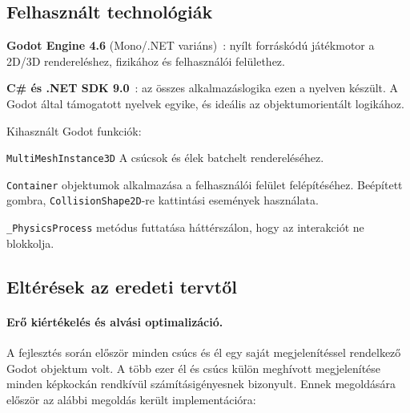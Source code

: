\subsection{Felhasznált technológiák}

\begin{compactitem}
\item \textbf{Godot Engine 4.6} (Mono/.NET variáns)~\cite{godot_engine}: nyílt forráskódú játékmotor a 2D/3D rendereléshez, fizikához és felhasználói felülethez.
\item \textbf{C\# és .NET SDK 9.0}~\cite{dotnet9}: az összes alkalmazáslogika ezen a nyelven készült. A Godot által támogatott nyelvek egyike, és ideális az objektumorientált logikához.
\end{compactitem}

Kihasznált Godot funkciók:
\begin{compactitem}
\item \texttt{MultiMeshInstance3D} A csúcsok és élek batchelt rendereléséhez.
\item \texttt{Container} objektumok alkalmazása a felhasználói felület felépítéséhez. Beépített gombra, \texttt{CollisionShape2D}-re kattintási események használata.
\item \texttt{\_PhysicsProcess} metódus futtatása háttérszálon, hogy az interakciót ne blokkolja.
\end{compactitem}

\subsection{Eltérések az eredeti tervtől}

\paragraph{Erő kiértékelés és alvási optimalizáció.}
A fejlesztés során először minden csúcs és él egy saját megjelenítéssel rendelkező Godot objektum volt.
A több ezer él és csúcs külön meghívott megjelenítése minden képkockán rendkívül számításigényesnek bizonyult. Ennek megoldására először az alábbi megoldás került implementációra:

